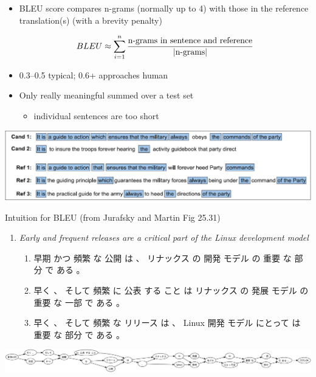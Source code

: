 \documentclass[a4paper,landscape,headrule,footrule,xetex]{foils}
\begin{document}
\begin{itemize}
\item BLEU score compares n-grams (normally up to 4) with those in the
  reference translation(s) (with a brevity penalty)

\[BLEU \approx\sum_{i=1}^{n} \frac{\textnormal{n-grams in sentence and reference}}{|\textnormal{n-grams}|}\]

\item 0.3--0.5 typical; 0.6+ approaches human
\item Only really meaningful summed over a test set
  \begin{itemize}
  \item individual sentences are too short
  \end{itemize}
\end{itemize}




  \hspace{-3em}\includegraphics[width=1.1\textwidth]{include/25.31.jpg.eps}

  \begin{center}
    Intuition for BLEU (from Jurafsky and Martin Fig 25.31)
  \end{center}

 \makexeCJKactive
\begin{enumerate}
\item \textit{Early and frequent releases are a critical part of the Linux development model}
  \begin{enumerate}
  \item 早期 かつ 頻繁 な 公開 は 、 リナックス の 開発 モデル の 重要 な 部分 で ある 。%
  \item 早く 、 そして 頻繁 に 公表 する こと は リナックス の 発展 モデル の 重要 な 一部 で ある 。 %
  \item 早く 、 そして 頻繁 な リリース は 、 Linux 開発 モデル にとって は 重要 な 部分 で ある 。 %
  \end{enumerate}
\end{enumerate}
 \makexeCJKinactive
\hspace{-20mm}\includegraphics[width=1.2\textwidth]{include/lattice-24.eps}
\end{document}
